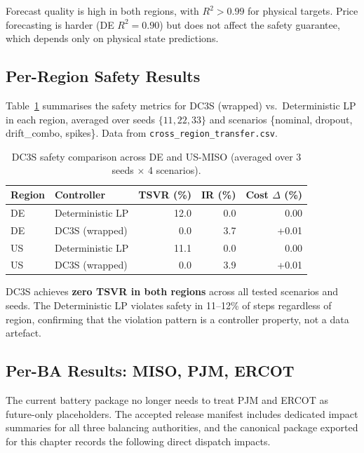 Forecast quality is high in both regions, with $R^2 > 0.99$ for
physical targets.  Price forecasting is harder (DE $R^2 = 0.90$) but
does not affect the safety guarantee, which depends only on physical
state predictions.

\subsection{Per-Region Safety Results}

Table~\ref{tab:region-safety} summarises the safety metrics for
DC3S (wrapped) vs.\ Deterministic LP in each region, averaged over
seeds $\{11, 22, 33\}$ and scenarios \{nominal, dropout, drift\_combo,
spikes\}.  Data from \texttt{cross\_region\_transfer.csv}.

\begin{table}[ht]
\centering
\caption{DC3S safety comparison across DE and US-MISO
  (averaged over 3 seeds $\times$ 4 scenarios).}
\label{tab:region-safety}
\begin{tabular}{llrrr}
\toprule
\textbf{Region} & \textbf{Controller} & \textbf{TSVR (\%)} &
  \textbf{IR (\%)} & \textbf{Cost $\Delta$ (\%)} \\
\midrule
DE & Deterministic LP & 12.0 & 0.0 &  0.00 \\
DE & DC3S (wrapped)   &  0.0 & 3.7 & +0.01 \\
\midrule
US & Deterministic LP & 11.1 & 0.0 &  0.00 \\
US & DC3S (wrapped)   &  0.0 & 3.9 & +0.01 \\
\bottomrule
\end{tabular}
\end{table}

DC3S achieves \textbf{zero TSVR in both regions} across all tested
scenarios and seeds.  The Deterministic LP violates safety in 11--12\%
of steps regardless of region, confirming that the violation pattern is
a controller property, not a data artefact.

\subsection{Per-BA Results: MISO, PJM, ERCOT}

The current battery package no longer needs to treat PJM and ERCOT as
future-only placeholders.  The accepted release manifest includes
dedicated impact summaries for all three balancing authorities, and the
canonical package exported for this chapter records the following direct
dispatch impacts.

